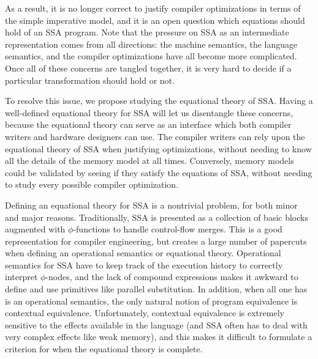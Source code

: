 \documentclass[acmsmall,screen,review]{acmart}
\begin{document}
As a result, it is no longer correct to justify compiler optimizations in terms of the simple imperative
model, and it is an open question which equations should hold of an SSA program. Note that the pressure
on SSA as an intermediate representation comes from all directions: the machine semantics, the language
semantics, and the compiler optimizations have all become more complicated. Once all of these concerns
are tangled together, it is very hard to decide if a particular transformation should hold or not. 

To resolve this issue, we propose studying the equational theory of SSA. Having a well-defined
equational theory for SSA will let us disentangle these concerns, because the equational theory can
serve as an interface which both compiler writers and hardware designers can use. The compiler writers
can rely upon the equational theory of SSA when justifying optimizations, without needing to know all
the details of the memory model at all times.  Conversely, memory models could be validated by
seeing if they satisfy the equations of SSA, without needing to study every possible compiler
optimization.

Defining an equational theory for SSA is a nontrivial problem, for both minor and major
reasons.  Traditionally, SSA is presented as a collection of basic blocks augmented with
$\phi$-functions to handle control-flow merges. This is a good representation for compiler
engineering, but creates a large number of papercuts when defining an operational semantics or
equational theory.  Operational semantics for SSA have to keep track of the execution history
to correctly interpret $\phi$-nodes, and the lack of compound expressions makes it awkward to
define and use primitives like parallel substitution. In addition, when all one has is an
operational semantics, the only natural notion of program equivalence is contextual
equivalence. Unfortunately, contextual equivalence is extremely sensitive to the effects
available in the language (and SSA often has to deal with very complex effects like weak
memory), and this makes it difficult to formulate a criterion for when the equational theory
is complete.
\end{document}
